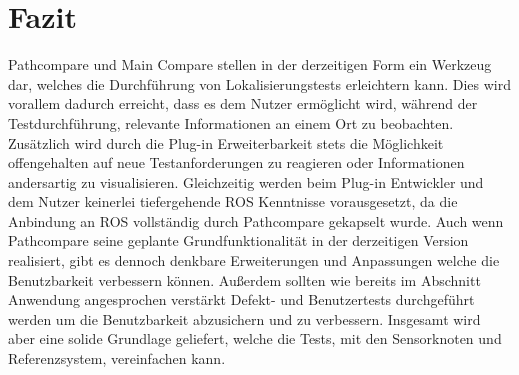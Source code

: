 \chapter{Fazit}
\label{sec:conclusion}
Pathcompare und Main Compare stellen in der derzeitigen Form ein Werkzeug dar, welches die
Durchführung von Lokalisierungstests erleichtern kann. Dies wird vorallem
dadurch erreicht, dass es dem Nutzer ermöglicht wird, während der Testdurchführung, relevante
Informationen an einem Ort zu beobachten. Zusätzlich wird durch die Plug-in
Erweiterbarkeit stets die Möglichkeit offengehalten auf neue Testanforderungen
zu reagieren oder Informationen andersartig zu visualisieren. Gleichzeitig
werden beim Plug-in Entwickler und dem Nutzer keinerlei tiefergehende ROS
Kenntnisse vorausgesetzt, da die Anbindung an ROS vollständig durch Pathcompare
gekapselt wurde. Auch wenn Pathcompare seine geplante Grundfunktionalität in der
derzeitigen Version realisiert, gibt es dennoch denkbare Erweiterungen und
Anpassungen welche die Benutzbarkeit verbessern können. 
Außerdem sollten wie bereits im Abschnitt Anwendung angesprochen verstärkt
Defekt- und Benutzertests durchgeführt werden um die Benutzbarkeit abzusichern
und zu verbessern. Insgesamt wird aber eine solide Grundlage geliefert,
welche die Tests, mit den Sensorknoten und Referenzsystem, vereinfachen kann.

